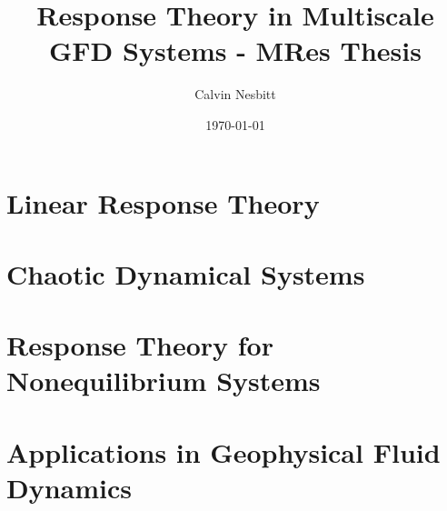 \documentclass[11pt,letterpaper,twoside,openright]{book}
\title{Response Theory in Multiscale GFD Systems - MRes Thesis}
\date{\today}
\author{Calvin Nesbitt}
\begin{document}
%
\maketitle

\tableofcontents 

\cleardoublepage


\chapter{Linear Response Theory}





\chapter{Chaotic Dynamical Systems}


\chapter{Response Theory for Nonequilibrium Systems}

%

\chapter{Applications in Geophysical Fluid Dynamics}



\clearpage 

\end{document}
